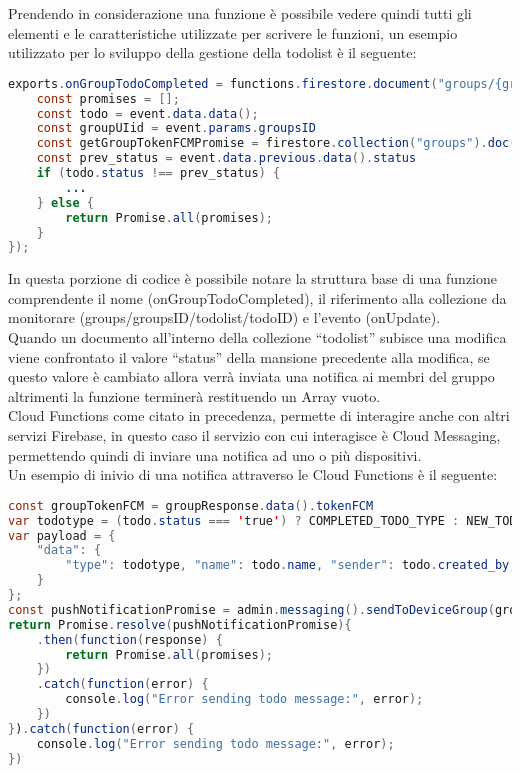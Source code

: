 Prendendo in considerazione una funzione è possibile vedere quindi tutti gli elementi e le caratteristiche utilizzate per scrivere le funzioni, un esempio utilizzato per lo sviluppo della gestione della todolist è il seguente:\\
\newpage

\begin{lstlisting}[language=java,caption={Funzone Cloud Functions}]
exports.onGroupTodoCompleted = functions.firestore.document("groups/{groupsID}/todolist/{todoID}") .onUpdate(event => {
    const promises = [];
    const todo = event.data.data();
    const groupUIid = event.params.groupsID
    const getGroupTokenFCMPromise = firestore.collection("groups").doc(groupUIid).get()
    const prev_status = event.data.previous.data().status
    if (todo.status !== prev_status) {
        ...
    } else {
        return Promise.all(promises);
    }
});
\end{lstlisting}

In questa porzione di codice è possibile notare la struttura base di una funzione comprendente il nome (onGroupTodoCompleted), il riferimento alla collezione da monitorare (groups/{groupsID}/todolist/{todoID}) e l'evento (onUpdate).\\
Quando un documento all'interno della collezione ``todolist'' subisce una modifica viene confrontato il valore ``status'' della mansione precedente alla modifica, se questo valore è cambiato allora verrà inviata una notifica ai membri del gruppo altrimenti la funzione terminerà restituendo un Array vuoto.\\
Cloud Functions come citato in precedenza, permette di interagire anche con altri servizi Firebase, in questo caso il servizio con cui interagisce è Cloud Messaging, permettendo quindi di inviare una notifica ad uno o più dispositivi.\\
Un esempio di inivio di una notifica attraverso le Cloud Functions è il seguente:
\newpage

\begin{lstlisting}[language=java,caption={Funzone Cloud Functions}]
const groupTokenFCM = groupResponse.data().tokenFCM
var todotype = (todo.status === 'true') ? COMPLETED_TODO_TYPE : NEW_TODO_TYPE;
var payload = {
    "data": {
        "type": todotype, "name": todo.name, "sender": todo.created_by,
    }
};
const pushNotificationPromise = admin.messaging().sendToDeviceGroup(groupTokenFCM, payload)
return Promise.resolve(pushNotificationPromise){
    .then(function(response) {
        return Promise.all(promises);
    })
    .catch(function(error) {
        console.log("Error sending todo message:", error);
    })
}).catch(function(error) {
    console.log("Error sending todo message:", error);
})
\end{lstlisting}



